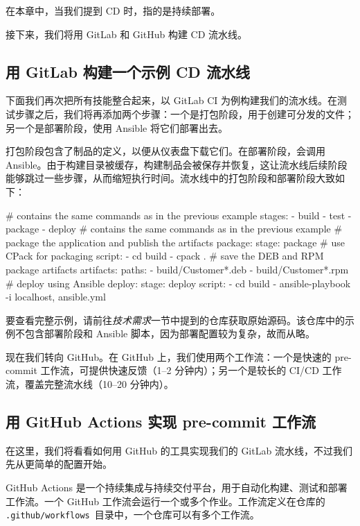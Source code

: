 \label{idx:955}
在本章中，当我们提到 CD 时，指的是持续部署。

接下来，我们将用 GitLab 和 GitHub 构建 CD 流水线。

\subsection{用 GitLab 构建一个示例 CD 流水线}

\label{idx:956}
下面我们再次把所有技能整合起来，以 GitLab CI 为例构建我们的流水线。在测试步骤之后，我们将再添加两个步骤：一个是打包阶段，用于创建可分发的文件；另一个是部署阶段，使用 Ansible 将它们部署出去。

打包阶段包含了制品的定义，以便从仪表盘下载它们。在部署阶段，会调用 Ansible。由于构建目录被缓存，构建制品会被保存并恢复，这让流水线后续阶段能够跳过一些步骤，从而缩短执行时间。流水线中的打包阶段和部署阶段大致如下：

\begin{codebox}[text]
# contains the same commands as in the previous example
stages:
  - build
  - test
  - package
  - deploy
# contains the same commands as in the previous example
# package the application and publish the artifacts
package:
  stage: package
  # use CPack for packaging
  script:
    - cd build
    - cpack .
  # save the DEB and RPM package artifacts
  artifacts:
    paths:
      - build/Customer*.deb
      - build/Customer*.rpm
# deploy using Ansible
deploy:
  stage: deploy
  script:
    - cd build
    - ansible-playbook -i localhost, ansible.yml
\end{codebox}

\label{idx:957}
要查看完整示例，请前往\emph{技术需求}一节中提到的仓库获取原始源码。该仓库中的示例不包含部署阶段和 Ansible 脚本，因为部署配置较为复杂，故而从略。

现在我们转向 GitHub。在 GitHub 上，我们使用两个工作流：一个是快速的 pre-commit 工作流，可提供快速反馈（1–2 分钟内）；另一个是较长的 CI/CD 工作流，覆盖完整流水线（10–20 分钟内）。

\subsection{用 GitHub Actions 实现 pre-commit 工作流}

\label{idx:958}
在这里，我们将看看如何用 GitHub 的工具实现我们的 GitLab 流水线，不过我们先从更简单的配置开始。

GitHub Actions 是一个持续集成与持续交付平台，用于自动化构建、测试和部署工作流。一个 GitHub 工作流会运行一个或多个作业。工作流定义在仓库的 \texttt{.\allowbreak{}github/\allowbreak{}workflows }目录中，一个仓库可以有多个工作流。

